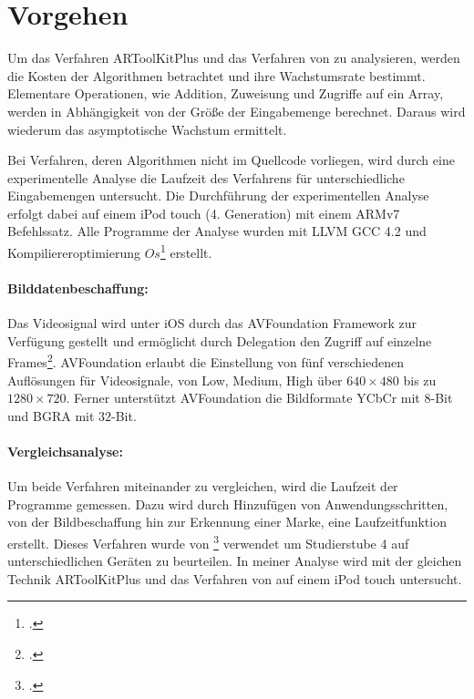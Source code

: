 \section{Vorgehen} %
\label{sec:vorgehen}
\begin{comment}
	Vorgehen: Analysemethoden vorstellen wie Algorithmen untersucht werden.
	Vergleich O-Notation
	Laufzeitanalyse
	Gleiche Kriterien (selbes Bild, selbes Video)
\end{comment}

Um das Verfahren ARToolKitPlus und das Verfahren von \citeauthor{hirzer08} zu analysieren, werden die Kosten der
 Algorithmen betrachtet und ihre Wachstumsrate bestimmt. Elementare Operationen, wie Addition, Zuweisung und
 Zugriffe auf ein Array, werden in Abhängigkeit von der Größe der Eingabemenge berechnet. Daraus wird wiederum das
 asymptotische Wachstum ermittelt.

Bei Verfahren, deren Algorithmen nicht im Quellcode vorliegen, wird durch eine experimentelle Analyse die Laufzeit des
 Verfahrens für unterschiedliche Eingabemengen untersucht. Die Durchführung der experimentellen Analyse erfolgt dabei
 auf einem iPod touch (4. Generation) mit einem ARMv7 Befehlssatz. Alle Programme der Analyse wurden mit
 LLVM GCC 4.2 und Kompiliereroptimierung $\mathit{Os}$\footcite[Vgl.][]{cc} erstellt.

\paragraph{Bilddatenbeschaffung:} %
\label{par:bilddatenbeschaffung}
Das Videosignal wird unter iOS durch das AVFoundation Framework zur Verfügung gestellt und ermöglicht durch Delegation
 den Zugriff auf einzelne Frames\footcite{avfoundation}. AVFoundation erlaubt die Einstellung von fünf verschiedenen
 Auflösungen für Videosignale, von Low, Medium, High über $640 \times 480$ bis zu $1280 \times 720$. Ferner unterstützt
 AVFoundation die Bildformate YCbCr mit $8$-Bit und BGRA mit $32$-Bit.

\paragraph{Vergleichsanalyse:} %
\label{par:vergleichsanalyse}
Um beide Verfahren miteinander zu vergleichen, wird die Laufzeit der Programme gemessen. Dazu wird durch Hinzufügen von
 Anwendungsschritten, von der Bildbeschaffung hin zur Erkennung einer Marke, eine Laufzeitfunktion erstellt. Dieses
 Verfahren wurde von \citeauthor{wagner09b}\footcite[Vgl.][]{wagner09b} verwendet um Studierstube 4 auf
 unterschiedlichen Geräten zu beurteilen. In meiner Analyse wird mit der gleichen Technik ARToolKitPlus und das
 Verfahren von \citeauthor{hirzer08} auf einem iPod touch untersucht.

